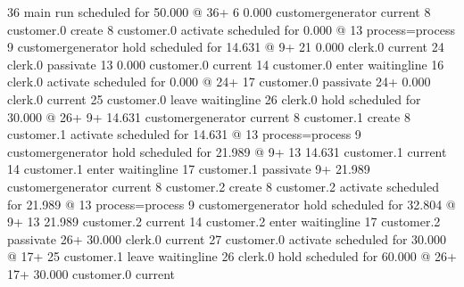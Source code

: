 \documentclass[letterpaper,10pt,english]{sphinxmanual}
\begin{document}
\begin{sphinxVerbatim}[commandchars=\\\{\}]
   36                                   main run                             scheduled for     50.000 @   36+
    6        0.000 customergenerator    current
    8                                   customer.0 create
    8                                   customer.0 activate                  scheduled for      0.000 @   13  process=process
    9                                   customergenerator hold               scheduled for     14.631 @    9+
   21        0.000 clerk.0              current
   24                                   clerk.0 passivate
   13        0.000 customer.0           current
   14                                   customer.0                           enter waitingline
   16                                   clerk.0 activate                     scheduled for      0.000 @   24+
   17                                   customer.0 passivate
   24+       0.000 clerk.0              current
   25                                   customer.0                           leave waitingline
   26                                   clerk.0 hold                         scheduled for     30.000 @   26+
    9+      14.631 customergenerator    current
    8                                   customer.1 create
    8                                   customer.1 activate                  scheduled for     14.631 @   13  process=process
    9                                   customergenerator hold               scheduled for     21.989 @    9+
   13       14.631 customer.1           current
   14                                   customer.1                           enter waitingline
   17                                   customer.1 passivate
    9+      21.989 customergenerator    current
    8                                   customer.2 create
    8                                   customer.2 activate                  scheduled for     21.989 @   13  process=process
    9                                   customergenerator hold               scheduled for     32.804 @    9+
   13       21.989 customer.2           current
   14                                   customer.2                           enter waitingline
   17                                   customer.2 passivate
   26+      30.000 clerk.0              current
   27                                   customer.0 activate                  scheduled for     30.000 @   17+
   25                                   customer.1                           leave waitingline
   26                                   clerk.0 hold                         scheduled for     60.000 @   26+
   17+      30.000 customer.0           current

\end{sphinxVerbatim}
\end{document}
